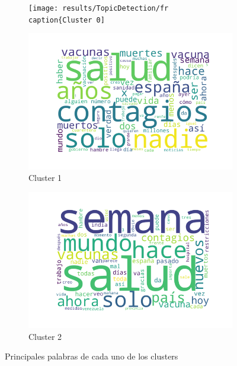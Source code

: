 \begin{figure}
    \centering
    \begin{subfigure}[b]{0.49\textwidth}
        \centering
        \texttt{[image: results/TopicDetection/fr
        \\caption\{Cluster 0]}
        \label{fig:es_c0}
    \end{subfigure}
    \hfill
    \begin{subfigure}[b]{0.49\textwidth}
        \centering
        \includegraphics[width=\textwidth]{results/TopicDetection/es/cluster1.png}
        \caption{Cluster 1}
        \label{fig:es_c1}
    \end{subfigure}
    \hfill
    \begin{subfigure}[b]{0.49\textwidth}
        \centering
        \includegraphics[width=\textwidth]{results/TopicDetection/es/cluster2.png}
        \caption{Cluster 2}
        \label{fig:es_c2}
    \end{subfigure}
    \hfill
    \caption{Principales palabras de cada uno de los clusters}
    \label{fig:es_clusters}
\end{figure}

